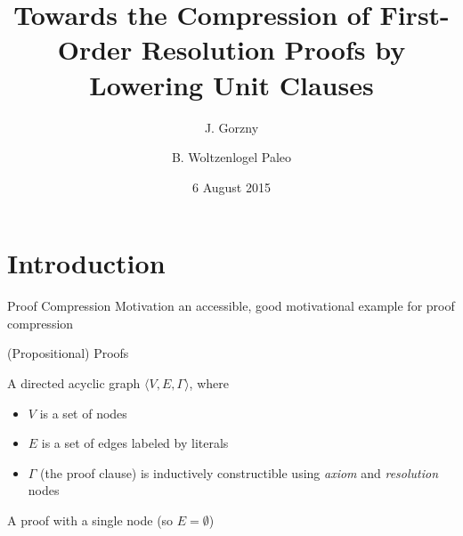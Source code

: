 \documentclass{beamer}
\title[First Order Lower Units] %
{Towards the Compression of First-Order Resolution Proofs by Lowering Unit Clauses}
\author[Gorzny, Woltzenlogel Paleo] %
{J. Gorzny\inst{1} \and B. Woltzenlogel Paleo\inst{2}}
\institute[] %
{
  \inst{1}%
  University of Victoria
  \and
  \inst{2}%
  Vienna University of Technology}
\date[CADE15] %
{6 August 2015}
\begin{document}
\begin{frame}
  \titlepage
\end{frame}





\section{Introduction}


\begin{frame}{Proof Compression Motivation}
an accessible, good motivational example for proof compression
\end{frame}

\begin{frame}{(Propositional) Proofs}

\begin{definition}[Proof]
A directed acyclic graph $\langle V,E,\Gamma \rangle$, where
\begin{itemize}
\item $V$ is a set of nodes
\item $E$ is a set of edges labeled by literals
\item $\Gamma$ (the proof clause) is inductively constructible using \emph{axiom} and \emph{resolution} nodes
\end{itemize}
\end{definition}

\begin{definition}[Axiom]
A proof with a single node (so $E=\emptyset$)
\end{definition}
\end{frame}
\end{document}
